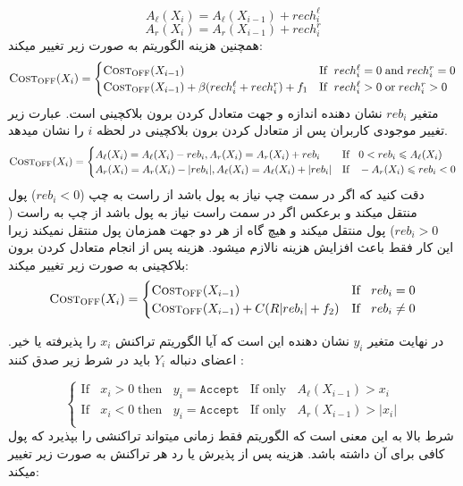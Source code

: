 $$A_{\ell}(X_i) = A_{\ell}(X_{i-1}) + rech^{\ell}_i $$
$$A_{r}(X_i) = A_{r}(X_{i-1}) + rech^{r}_i $$
همچنین هزینه الگوریتم \off
به صورت زیر تغییر میکند:
\begin{equation}
\textsc{Cost}_{\textsc{OFF}}(X_{i}) =
    \begin{cases}
      \textsc{Cost}_{\textsc{OFF}}(X_{i-1}) & \text{If } \; rech^{\ell}_i = 0 \; \text{and} \; rech^{r}_i = 0  \\
      \textsc{Cost}_{\textsc{OFF}}(X_{i-1}) + \beta(rech^{\ell}_i+rech^{r}_i) + f_1 & \text{If } \; rech^{\ell}_i > 0 \; \text{or} \; rech^{r}_i > 0  \\
    \end{cases}       
\end{equation}
متغیر $reb_i$ نشان دهنده اندازه و جهت متعادل کردن برون بلاکچینی است. عبارت زیر تغییر موجودی کاربران پس از متعادل کردن برون بلاکچینی در لحظه
$i$
 را نشان میدهد.
\begin{equation}
\textsc{Cost}_{\textsc{OFF}}(X_{i}) =
    \begin{cases}
      A_{\ell}(X_i) =  A_{\ell}(X_i) - reb_i ,  A_{r}(X_i)=  A_{r}(X_i) + reb_i  & \text{If }\;\; 0<reb_i \leqslant A_{\ell}(X_i) \\
      A_{r}(X_i) =  A_{r}(X_i) - |reb_i| ,  A_{\ell}(X_i)=  A_{\ell}(X_i) + |reb_i|  & \text{If }\;\;  -A_{r}(X_i) \leqslant reb_i < 0 \\
    \end{cases}       
\end{equation}
دقت کنید که اگر در سمت چپ نیاز به پول باشد \off از راست به چپ 
($reb_i < 0$)
پول منتقل میکند و برعکس اگر در سمت راست نیاز به پول باشد \off از چپ به راست
($reb_i > 0$)
پول منتقل میکند و هیچ گاه از هر دو جهت همزمان پول منتقل نمیکند زیرا این کار فقط باعث افزایش هزینه نالازم میشود.
هزینه
\off
پس از انجام متعادل کردن برون بلاکچینی به صورت زیر تغییر میکند:
 \begin{equation}
\textsc{Cost}_{\textsc{OFF}}(X_{i}) =
    \begin{cases}
      \textsc{Cost}_{\textsc{OFF}}(X_{i-1}) & \text{If } \;\; reb_i = 0  \\
      \textsc{Cost}_{\textsc{OFF}}(X_{i-1}) + C(R|reb_i| + f_2) & \text{If } \;\; reb_i \neq 0  \\
    \end{cases}       
\end{equation}


در نهایت متغیر $y_i$ نشان دهنده این است که آیا الگوریتم \off تراکنش $x_i$ را پذیرفته یا خیر. اعضای دنباله $Y_i$ باید در شرط زیر صدق کنند :

\begin{equation}
    \begin{cases}
      \text{If } \;\; x_i > 0 \; \text{then } \;\; y_i = \texttt{Accept} \;\; \text{ If only } \;\; A_{\ell}(X_{i-1}) > x_i \\
      \text{If } \;\; x_i < 0 \; \text{then } \;\; y_i = \texttt{Accept} \;\; \text{ If only } \;\; A_{r}(X_{i-1}) > |x_i| \\
    \end{cases}       
\end{equation}
شرط بالا به این معنی است که الگوریتم فقط زمانی میتواند تراکنشی را بپذیرد که پول کافی برای آن داشته باشد.  هزینه 
\off
پس از پذیرش یا رد هر تراکنش به صورت زیر تغییر میکند:

